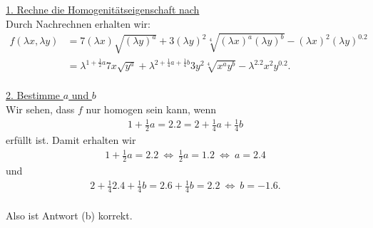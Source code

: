 \underline{1. Rechne die Homogenitätseigenschaft nach}\\
Durch Nachrechnen erhalten wir:
\begin{align*}
f(\lambda x, \lambda y ) 
&=
7 (\lambda x) \sqrt{(\lambda y)^a}
+
3 (\lambda y)^2 \sqrt[4]{(\lambda x )^a (\lambda y )^b} - (\lambda x)^2 (\lambda y)^{0.2}\\
&=
\lambda^{1 + \frac{1}{2} a} 7x \sqrt{y^a}
+
\lambda^{2 + \frac{1}{4} a + \frac{1}{4} b}
3 y^2 \sqrt[4]{x^a y^b} - \lambda^{2.2} x^2 y^{0.2}.
\end{align*}
\ \\
\underline{2. Bestimme $ a  $ und $ b $}\\
Wir sehen, dass $ f $ nur homogen sein kann, wenn
\begin{align*}
1 + \frac{1}{2} a = 2.2 = 2 + \frac{1}{4} a + \frac{1}{4} b
\end{align*}
erfüllt ist.
Damit erhalten wir 
\begin{align*}
1 + \frac{1}{2} a = 2.2 
\ \Leftrightarrow \
\frac{1}{2} a = 1.2 
\ \Leftrightarrow \
a = 2.4
\end{align*}
und 
\begin{align*}
2 + \frac{1}{4} 2.4 + \frac{1}{4} b = 2.6 + \frac{1}{4} b = 2.2 
\ \Leftrightarrow \
b = - 1.6.
\end{align*}
\ \\ 
Also ist Antwort (b) korrekt.